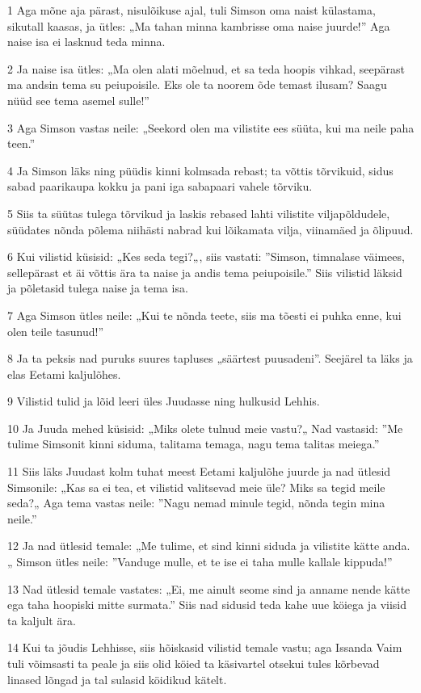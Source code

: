 \par 1 Aga mõne aja pärast, nisulõikuse ajal, tuli Simson oma naist külastama, sikutall kaasas, ja ütles: „Ma tahan minna kambrisse oma naise juurde!” Aga naise isa ei lasknud teda minna.
\par 2 Ja naise isa ütles: „Ma olen alati mõelnud, et sa teda hoopis vihkad, seepärast ma andsin tema su peiupoisile. Eks ole ta noorem õde temast ilusam? Saagu nüüd see tema asemel sulle!”
\par 3 Aga Simson vastas neile: „Seekord olen ma vilistite ees süüta, kui ma neile paha teen.”
\par 4 Ja Simson läks ning püüdis kinni kolmsada rebast; ta võttis tõrvikuid, sidus sabad paarikaupa kokku ja pani iga sabapaari vahele tõrviku.
\par 5 Siis ta süütas tulega tõrvikud ja laskis rebased lahti vilistite viljapõldudele, süüdates nõnda põlema niihästi nabrad kui lõikamata vilja, viinamäed ja õlipuud.
\par 6 Kui vilistid küsisid: „Kes seda tegi?„, siis vastati: ”Simson, timnalase väimees, sellepärast et äi võttis ära ta naise ja andis tema peiupoisile.” Siis vilistid läksid ja põletasid tulega naise ja tema isa.
\par 7 Aga Simson ütles neile: „Kui te nõnda teete, siis ma tõesti ei puhka enne, kui olen teile tasunud!”
\par 8 Ja ta peksis nad puruks suures tapluses „säärtest puusadeni”. Seejärel ta läks ja elas Eetami kaljulõhes.
\par 9 Vilistid tulid ja lõid leeri üles Juudasse ning hulkusid Lehhis.
\par 10 Ja Juuda mehed küsisid: „Miks olete tulnud meie vastu?„ Nad vastasid: ”Me tulime Simsonit kinni siduma, talitama temaga, nagu tema talitas meiega.”
\par 11 Siis läks Juudast kolm tuhat meest Eetami kaljulõhe juurde ja nad ütlesid Simsonile: „Kas sa ei tea, et vilistid valitsevad meie üle? Miks sa tegid meile seda?„ Aga tema vastas neile: ”Nagu nemad minule tegid, nõnda tegin mina neile.”
\par 12 Ja nad ütlesid temale: „Me tulime, et sind kinni siduda ja vilistite kätte anda.„ Simson ütles neile: ”Vanduge mulle, et te ise ei taha mulle kallale kippuda!”
\par 13 Nad ütlesid temale vastates: „Ei, me ainult seome sind ja anname nende kätte ega taha hoopiski mitte surmata.” Siis nad sidusid teda kahe uue köiega ja viisid ta kaljult ära.
\par 14 Kui ta jõudis Lehhisse, siis hõiskasid vilistid temale vastu; aga Issanda Vaim tuli võimsasti ta peale ja siis olid köied ta käsivartel otsekui tules kõrbevad linased lõngad ja tal sulasid köidikud kätelt.
